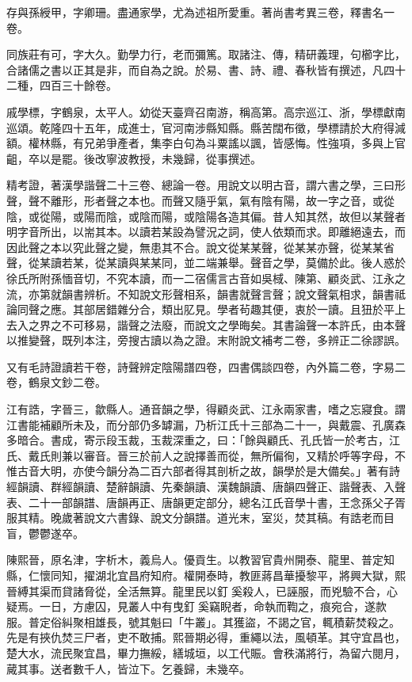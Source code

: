 \begin{pinyinscope}
存與孫綬甲，字卿珊。盡通家學，尤為述祖所愛重。著尚書考異三卷，釋書名一卷。

同族莊有可，字大久。勤學力行，老而彌篤。取諸注、傳，精研義理，句櫛字比，合諸儒之書以正其是非，而自為之說。於易、書、詩、禮、春秋皆有撰述，凡四十二種，四百三十餘卷。

戚學標，字鶴泉，太平人。幼從天臺齊召南游，稱高第。高宗巡江、浙，學標獻南巡頌。乾隆四十五年，成進士，官河南涉縣知縣。縣苦闊布徵，學標請於大府得減額。權林縣，有兄弟爭產者，集李白句為斗粟謠以諷，皆感悔。性強項，多與上官齟，卒以是罷。後改寧波教授，未幾歸，從事撰述。

精考證，著漢學諧聲二十三卷、總論一卷。用說文以明古音，謂六書之學，三曰形聲，聲不離形，形者聲之本也。而聲又隨乎氣，氣有陰有陽，故一字之音，或從陰，或從陽，或陽而陰，或陰而陽，或陰陽各造其偏。昔人知其然，故但以某聲者明字音所出，以耑其本。以讀若某設為譬況之詞，使人依類而求。即離絕遠去，而因此聲之本以究此聲之變，無患其不合。說文從某某聲，從某某亦聲，從某某省聲，從某讀若某，從某讀與某某同，並二端兼舉。聲音之學，莫備於此。後人惑於徐氏所附孫愐音切，不究本讀，而一二宿儒言古音如吳棫、陳第、顧炎武、江永之流，亦第就韻書辨析。不知說文形聲相系，韻書就聲言聲；說文聲氣相求，韻書祗論同聲之應。其部居錯雜分合，類出肊見。學者茍趣其便，衷於一讀。且狃於平上去入之界之不可移易，諧聲之法廢，而說文之學晦矣。其書論聲一本許氏，由本聲以推變聲，既列本注，旁搜古讀以為之證。末附說文補考二卷，多辨正二徐謬誤。

又有毛詩證讀若干卷，詩聲辨定陰陽譜四卷，四書偶談四卷，內外篇二卷，字易二卷，鶴泉文鈔二卷。

江有誥，字晉三，歙縣人。通音韻之學，得顧炎武、江永兩家書，嗜之忘寢食。謂江書能補顧所未及，而分部仍多罅漏，乃析江氏十三部為二十一，與戴震、孔廣森多暗合。書成，寄示段玉裁，玉裁深重之，曰：「餘與顧氏、孔氏皆一於考古，江氏、戴氏則兼以審音。晉三於前人之說擇善而從，無所偏徇，又精於呼等字母，不惟古音大明，亦使今韻分為二百六部者得其剖析之故，韻學於是大備矣。」著有詩經韻讀、群經韻讀、楚辭韻讀、先秦韻讀、漢魏韻讀、唐韻四聲正、諧聲表、入聲表、二十一部韻譜、唐韻再正、唐韻更定部分，總名江氏音學十書，王念孫父子胥服其精。晚歲著說文六書錄、說文分韻譜。道光末，室災，焚其稿。有誥老而目盲，鬱鬱遂卒。

陳熙晉，原名津，字析木，義烏人。優貢生。以教習官貴州開泰、龍里、普定知縣，仁懷同知，擢湖北宜昌府知府。權開泰時，教匪蔣昌華擾黎平，將興大獄，熙晉縛其渠而貸諸脅從，全活無算。龍里民以釘奚殺人，已誣服，而兇驗不合，心疑焉。一日，方慮囚，見叢人中有曳釘奚竊睨者，命執而鞫之，痕宛合，遂款服。普定俗糾聚相雄長，號其魁曰「牛叢」。其獲盜，不謁之官，輒積薪焚殺之。先是有挾仇焚三尸者，吏不敢捕。熙晉期必得，重繩以法，風頓革。其守宜昌也，楚大水，流民聚宜昌，畢力撫綏，繕城垣，以工代賑。會秩滿將行，為留六閱月，蕆其事。送者數千人，皆泣下。乞養歸，未幾卒。


\end{pinyinscope}
